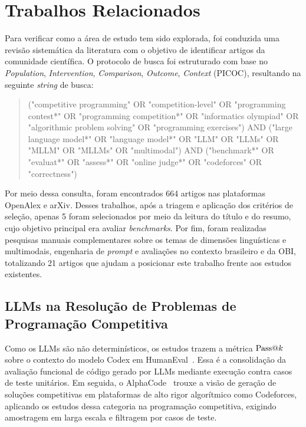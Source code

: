 \chapter{Trabalhos Relacionados}\label{cap:relacionados}

Para verificar como a área de estudo tem sido explorada, foi conduzida uma revisão sistemática da literatura com o objetivo de identificar artigos da comunidade científica. O protocolo de busca foi estruturado com base no \textit{Population}, \textit{Intervention}, \textit{Comparison}, \textit{Outcome}, \textit{Context} (PICOC), resultando na seguinte \textit{string} de busca:

\begin{quote}
\small\ttfamily
("competitive programming" OR "competition-level" OR "programming contest*" OR "programming competition*" OR "informatics olympiad" OR "algorithmic problem solving" OR "programming exercises")
AND
("large language model*" OR "language model*" OR "LLM" OR "LLMs" OR "MLLM" OR "MLLMs" OR "multimodal")
AND
("benchmark*" OR "evaluat*" OR "assess*" OR "online judge*" OR "codeforces" OR "correctness")
\end{quote}

Por meio dessa consulta, foram encontrados 664 artigos nas plataformas OpenAlex e arXiv. Desses trabalhos, após a triagem e aplicação dos critérios de seleção, apenas 5 foram selecionados por meio da leitura do título e do resumo, cujo objetivo principal era avaliar \textit{benchmarks}. Por fim, foram realizadas pesquisas manuais complementares sobre os temas de dimensões linguísticas e multimodais, engenharia de \textit{prompt} e avaliações no contexto brasileiro e da OBI, totalizando 21 artigos que ajudam a posicionar este trabalho frente aos estudos existentes.

\section{LLMs na Resolução de Problemas de Programação Competitiva}\label{sec:rel-comp-prog}

Como os LLMs são não determinísticos, os estudos trazem a métrica $\mathrm{Pass@}k$ sobre o contexto do modelo Codex em HumanEval~\citep{chen2021evaluating}. Essa é a consolidação da avaliação funcional de código gerado por LLMs mediante execução contra casos de teste unitários. Em seguida, o AlphaCode~\citep{li2022competition} trouxe a visão de geração de soluções competitivas em plataformas de alto rigor algorítmico como Codeforces, aplicando os estudos dessa categoria na programação competitiva, exigindo amostragem em larga escala e filtragem por casos de teste. 

